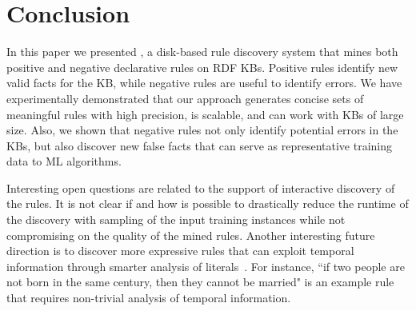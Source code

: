 \section{Conclusion}

In this paper we presented \krd, a disk-based rule discovery system that mines both positive and negative declarative rules on RDF KBs. Positive rules identify new valid facts for the KB, while negative rules are useful to identify errors. 
We have experimentally demonstrated that our approach generates concise sets of meaningful rules with high precision,
is scalable, and can work with KBs of large size. 
Also, we shown that negative rules not only identify potential errors in the KBs, but also discover new false facts that can serve as representative training data to ML algorithms.

Interesting open questions are related to the support of interactive discovery of the rules. It is not clear if and how is possible to drastically reduce the runtime of the discovery with sampling of the input training instances while not compromising on the quality of the mined rules. 
Another interesting future direction is to discover more expressive rules that can exploit temporal information through smarter analysis of literals~\cite{abedjan2015temporal}. For instance, ``if two people are not born in the same century, then they cannot be married" is an example rule that requires non-trivial analysis of temporal information. 


